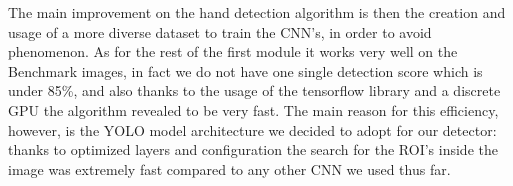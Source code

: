 The main improvement on the hand detection algorithm is then the creation and usage of a more diverse dataset to train the CNN's, in order to avoid phenomenon.
As for the rest of the first module it works very well on the Benchmark images, in fact we do not have one single detection score which is under 85\%, 
and also thanks to the usage of the tensorflow library and a discrete GPU the algorithm revealed to be very fast. The main reason for this efficiency, however,
is the YOLO model architecture we decided to adopt for our detector: thanks to optimized layers and configuration the search for the ROI's inside the image
was extremely fast compared to any other CNN we used thus far.

